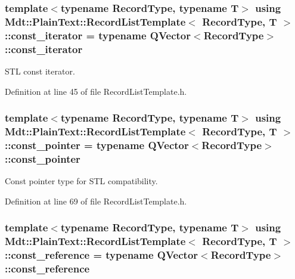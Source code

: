 \subsubsection[{\texorpdfstring{const\+\_\+iterator}{const_iterator}}]{\setlength{\rightskip}{0pt plus 5cm}template$<$typename Record\+Type, typename T$>$ using {\bf Mdt\+::\+Plain\+Text\+::\+Record\+List\+Template}$<$ Record\+Type, T $>$\+::{\bf const\+\_\+iterator} =  typename Q\+Vector$<$Record\+Type$>$\+::{\bf const\+\_\+iterator}}\hypertarget{class_mdt_1_1_plain_text_1_1_record_list_template_abfba36291fe9cb605ec432ed873ce4ea}{}\label{class_mdt_1_1_plain_text_1_1_record_list_template_abfba36291fe9cb605ec432ed873ce4ea}


S\+TL const iterator. 



Definition at line 45 of file Record\+List\+Template.\+h.

\subsubsection[{\texorpdfstring{const\+\_\+pointer}{const_pointer}}]{\setlength{\rightskip}{0pt plus 5cm}template$<$typename Record\+Type, typename T$>$ using {\bf Mdt\+::\+Plain\+Text\+::\+Record\+List\+Template}$<$ Record\+Type, T $>$\+::{\bf const\+\_\+pointer} =  typename Q\+Vector$<$Record\+Type$>$\+::{\bf const\+\_\+pointer}}\hypertarget{class_mdt_1_1_plain_text_1_1_record_list_template_a4f7a4908afbe8ec86a57c2a9922ceed3}{}\label{class_mdt_1_1_plain_text_1_1_record_list_template_a4f7a4908afbe8ec86a57c2a9922ceed3}


Const pointer type for S\+TL compatibility. 



Definition at line 69 of file Record\+List\+Template.\+h.

\subsubsection[{\texorpdfstring{const\+\_\+reference}{const_reference}}]{\setlength{\rightskip}{0pt plus 5cm}template$<$typename Record\+Type, typename T$>$ using {\bf Mdt\+::\+Plain\+Text\+::\+Record\+List\+Template}$<$ Record\+Type, T $>$\+::{\bf const\+\_\+reference} =  typename Q\+Vector$<$Record\+Type$>$\+::{\bf const\+\_\+reference}}\hypertarget{class_mdt_1_1_plain_text_1_1_record_list_template_af264f3a2efda437fd0f58cbb15209b06}{}\label{class_mdt_1_1_plain_text_1_1_record_list_template_af264f3a2efda437fd0f58cbb15209b06}


